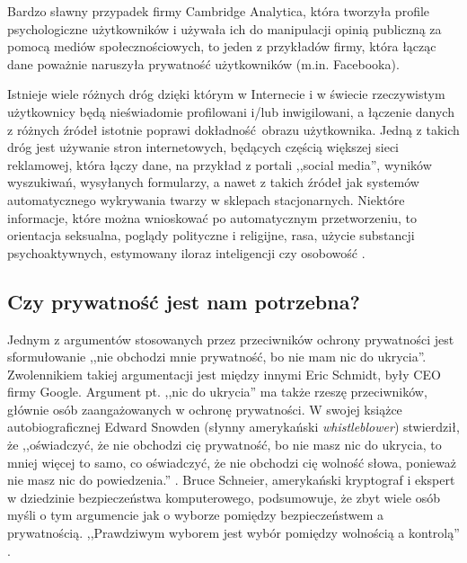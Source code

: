 Bardzo sławny przypadek firmy Cambridge Analytica, która tworzyła profile
psychologiczne użytkowników i używała ich do manipulacji opinią publiczną za
pomocą mediów społecznościowych, to jeden z przykładów firmy, która łącząc dane
poważnie naruszyła prywatność użytkowników (m.in. Facebooka).

Istnieje wiele różnych dróg dzięki którym w Internecie i w świecie rzeczywistym
użytkownicy będą nieświadomie profilowani i/lub inwigilowani, a łączenie danych
z różnych źródeł istotnie poprawi dokładność obrazu użytkownika. Jedną z takich
dróg jest używanie stron internetowych, będących częścią większej sieci
reklamowej, która łączy dane, na przykład z portali ,,social media'', wyników
wyszukiwań, wysyłanych formularzy, a nawet z takich źródeł jak systemów
automatycznego wykrywania twarzy w sklepach stacjonarnych. Niektóre informacje,
które można wnioskować po automatycznym przetworzeniu, to orientacja seksualna,
poglądy polityczne i religijne, rasa, użycie substancji psychoaktywnych,
estymowany iloraz inteligencji czy osobowość \cite{kosinski2013private}.

\subsection{Czy prywatność jest nam potrzebna?}
Jednym z argumentów stosowanych przez przeciwników ochrony prywatności jest
sformułowanie ,,nie obchodzi mnie prywatność, bo nie mam nic do ukrycia''.
Zwolennikiem takiej argumentacji jest między innymi Eric Schmidt, były CEO firmy
Google. Argument pt. ,,nic do ukrycia'' ma także rzeszę przeciwników, głównie
osób zaangażowanych w ochronę prywatności. W swojej książce autobiograficznej
Edward Snowden (słynny amerykański \emph{whistleblower}) stwierdził, że
,,oświadczyć, że nie obchodzi cię prywatność, bo nie masz nic do ukrycia, to
mniej więcej to samo, co oświadczyć, że nie obchodzi cię wolność słowa, ponieważ
nie masz nic do powiedzenia.'' \cite{snowden2019pamiec}. Bruce Schneier,
amerykański kryptograf i ekspert w dziedzinie bezpieczeństwa komputerowego,
podsumowuje, że zbyt wiele osób myśli o tym argumencie jak o wyborze pomiędzy
bezpieczeństwem a prywatnością. ,,Prawdziwym wyborem jest wybór pomiędzy
wolnością a kontrolą'' \cite{schneier2006eternal}.

